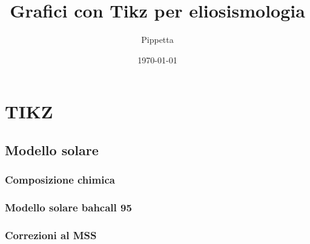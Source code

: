 \documentclass[oneside,12pt,fleqn]{memoir}
\author{Pippetta}
\title{Grafici con Tikz per eliosismologia}
\date{\today}
\begin{document}
\maketitle
\tableofcontents*

\part{TIKZ}


\chapter{Modello solare}

\section{Composizione chimica}



\section{Modello solare bahcall 95}

\clearpage




\section{Correzioni al MSS}

%


\end{document}
